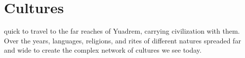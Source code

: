 \section{Cultures}
\begin{linenumbers}
quick to travel to the far reaches of Yuadrem, carrying civilization with them.
Over the years, languages, religions, and rites of different natures spreaded far and wide to create the complex network of cultures we see today.
\end{linenumbers}




